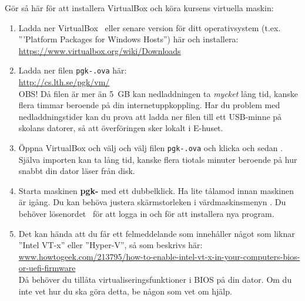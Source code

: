 Gör så här för att installera VirtualBox och köra kursens virtuella maskin:
\begin{enumerate}
\item  Ladda ner VirtualBox \VirtualBoxVersion~eller senare version för ditt operativsystem (t.ex. '''Platform Packages for Windows Hosts'') här och installera: \\ \url{https://www.virtualbox.org/wiki/Downloads}


\item     Ladda ner filen \texttt{pgk-\VMName.ova} här: \\ \url{http://cs.lth.se/pgk/vm/} \\ OBS! Då filen är mer än 5~GB kan nedladdningen ta \textit{mycket} lång tid, kanske flera timmar beroende på din internetuppkoppling. Har du problem med nedladdningstider kan du prova att ladda ner filen till ett USB-minne på skolans datorer, så att överföringen sker lokalt i E-huset.

\item     Öppna VirtualBox och välj  och välj filen \texttt{pgk-\VMName.ova} och klicka  och sedan . Själva importen kan ta lång tid, kanske flera tiotals minuter beroende på hur snabbt din dator läser från disk.

\item Starta maskinen \textbf{pgk-\VMName} med ett dubbelklick. Ha lite tålamod innan maskinen är igång. Du kan behöva justera skärmstorleken i värdmaskinsmenyn . Du  behöver lösenordet~\textbf{\texttt{\VMPassword}} för att logga in och för att installera nya program. 

\item Det kan hända att du får ett felmeddelande som innehåller något som liknar ''Intel VT-x'' eller ''Hyper-V'', så som beskrivs här:
\\ \href{http://www.howtogeek.com/213795/how-to-enable-intel-vt-x-in-your-computers-bios-or-uefi-firmware/}{www.howtogeek.com/213795/how-to-enable-intel-vt-x-in-your-computers-bios-or-uefi-firmware}\\
Då behöver du tillåta virtualiseringsfunktioner i BIOS på din dator. Om du inte vet hur du ska göra detta, be någon som vet om hjälp.


\end{enumerate}
